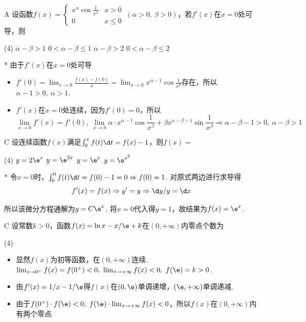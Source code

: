 \begin{choice}{A}
    设函数$f(x)=\begin{cases}
        x^\alpha\cos\frac{1}{x^\beta} & x>0\\
        0 & x\leq 0
    \end{cases}\ (\alpha>0,\ \beta>0)$，若$f'(x)$在$x=0$处可导，则
\begin{tasks}(4)
    \task $\alpha-\beta>1$
    \task $0<\alpha-\beta\leq 1$
    \task $\alpha-\beta>2$
    \task $0<\alpha-\beta\leq 2$
\end{tasks}
\end{choice}
\begin{solution}*
由于$f'(x)$在$x=0$处可导
\begin{itemize}
    \item $f'(0)=\lim_{x\to 0}\frac{f(x)-f(0)}{x}=\lim_{x\to 0}x^{\alpha -1}\cos\frac{1}{x^\beta}$存在，所以$\alpha-1>0,\ \alpha>1$.
    \item $f'(x)$在$x=0$处连续，因为$f'(0)=0$，所以
    \[\lim_{x\to 0}f'(x)=f'(0),\ \lim_{x\to 0}\alpha\cdot x^{\alpha-1}\cos\frac{1}{x^\beta}+\beta x^{\alpha-\beta-1}\sin\frac{1}{x^\beta}\Longrightarrow\alpha-\beta-1>0,\ \alpha-\beta>1\]
\end{itemize}
\end{solution}

\begin{choice}{C}
    设连续函数$f(x)$满足$\int_0^xf(t)\d t=f(x)-1$，则$f(x)=$
\begin{tasks}(4)
    \task $y=2\e^x$
    \task $y=\e^{2x}$
    \task $y=\e^x$
    \task $y=\e^{x^2}$
\end{tasks}
\end{choice}
\begin{solution}*
    令$x=0$时，$\int_0^0f(t)\d t=f(0)-1=0\Rightarrow f(0)=1$. 对原式两边进行求导得
    \[f'(x)=f(x)\Rightarrow y'=y\Rightarrow\d y/y=\d x\]
    
    所以该微分方程通解为$y=C\e^x$. 将$x=0$代入得$y=1$，故结果为$f(x)=\e^x$.
\end{solution}

\begin{choice}{C}
    设常数$k>0$，函数$f(x)=\ln x-x/\e+k$在$(0,+\infty)$内零点个数为
\begin{tasks}(4)
\end{tasks}
\end{choice}
\begin{solution}
\begin{itemize}
    \item 显然$f(x)$为初等函数，在$(0,+\infty)$连续. $\lim_{x\to0^+}f(x)=f(0^+)<0,\ \lim_{x\to +\infty}f(x)<0,\ f(\e)=k>0$.
    \item 由$f'(x)=1/x-1/\e$得$f(x)$在$(0,\e)$单调递增，$(\e,+\infty)$单调递减.
    \item 由于$f(0^+)\cdot f(\e)<0,\ f(\e)\cdot\lim_{x\to+\infty}f(x)<0$，所以$f(x)$在$(0,+\infty)$内有两个零点.
\end{itemize}
\end{solution}

